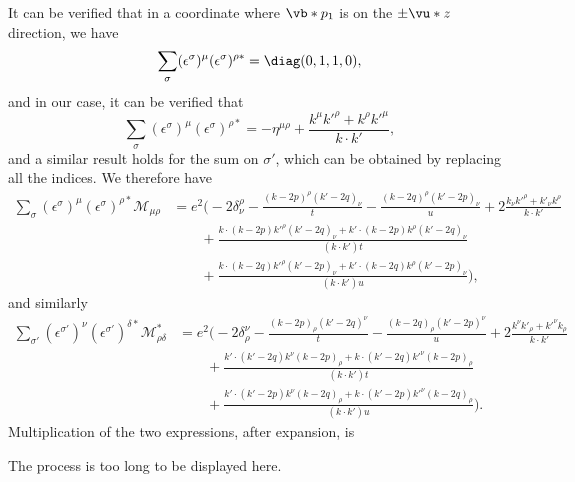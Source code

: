 It can be verified that in a coordinate where $\vb*{p}_1$ is on the $\pm \vu*{z}$ direction, we have 
\[
    \sum_\sigma (\epsilon^\sigma)^\mu (\epsilon^\sigma)^{\rho *} = \diag(0, 1, 1, 0),
\] 
and in our case, it can be verified that 
\begin{equation}
    \sum_\sigma (\epsilon^\sigma)^\mu (\epsilon^\sigma)^{\rho *} = - \eta^{\mu \rho} + 
    \frac{k^\mu k'^\rho + k^\rho k'^\mu }{k \cdot k'},
\end{equation}
and a similar result holds for the sum on $\sigma'$, which can be obtained by replacing all the indices. 
We therefore have 
\[
    \begin{aligned}
        \sum_\sigma (\epsilon^\sigma)^\mu (\epsilon^\sigma)^{\rho *} \mathcal{M}_{\mu \rho} &= e^2
        \Big( - 2 \delta^\rho_\nu - \frac{(k-2p)^\rho (k'-2q)_\nu}{t} - \frac{(k-2q)^\rho (k'-2p)_\nu}{u} 
        + 2 \frac{k_\nu k'^\rho + k'_\nu k^\rho}{k \cdot k'} \\
        &\quad \quad + \frac{k \cdot (k-2p) k'^\rho (k'-2q)_\nu + k' \cdot (k - 2p) k^\rho (k'-2q)_\nu}{(k \cdot k') t} \\
        &\quad \quad + \frac{k \cdot (k-2q) k'^\rho (k'-2p)_\nu + k' \cdot (k - 2q) k^\rho (k'-2p)_\nu}{(k \cdot k') u} \Big),
    \end{aligned}
\]
and similarly 
\[
    \begin{aligned}
        \sum_{\sigma'} (\epsilon^{\sigma'})^\nu (\epsilon^{\sigma'})^{\delta *} \mathcal{M}_{\rho \delta}^* &=
        e^2 \Big( - 2 \delta_\rho^\nu - \frac{(k-2p)_\rho (k'-2q)^\nu}{t} - \frac{(k-2q)_\rho (k'-2p)^\nu}{u} 
        + 2 \frac{k^\nu k'_\rho + k'^\nu k_\rho}{k \cdot k'} \\
        &\quad \quad + \frac{k' \cdot (k'-2q) k^\nu (k-2p)_\rho + k \cdot (k' - 2q) k'^\nu (k-2p)_\rho}{(k \cdot k') t} \\
        &\quad \quad + \frac{k' \cdot (k'-2p) k^\nu (k-2q)_\rho + k \cdot (k' - 2p) k'^\nu (k-2q)_\rho}{(k \cdot k') u} \Big).
    \end{aligned}
\]
Multiplication of the two expressions, after expansion, is 

The process is too long to be displayed here. 